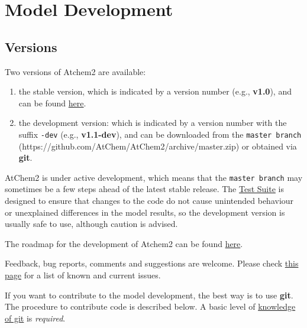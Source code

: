 \chapter{Model Development} \label{ch:development}

\section{Versions} \label{sec:versions}

Two versions of Atchem2 are available:

\begin{enumerate}
\item the stable version, which is indicated by a version number
  (e.g., \textbf{v1.0}), and can be found
  \href{https://github.com/AtChem/AtChem2/releases}{here}.
\item the development version: which is indicated by a version number
  with the suffix \texttt{-dev} (e.g., \textbf{v1.1-dev}), and can be
  downloaded from the \texttt{master\ branch}
  (https://github.com/AtChem/AtChem2/archive/master.zip) or obtained
  via \textbf{git}.
\end{enumerate}

AtChem2 is under active development, which means that the
\texttt{master\ branch} may sometimes be a few steps ahead of the
latest stable release. The \hyperref[sec:testsuite]{Test Suite} is
designed to ensure that changes to the code do not cause unintended
behaviour or unexplained differences in the model results, so the
development version is usually safe to use, although caution is
advised.

The roadmap for the development of Atchem2 can be found
\href{https://github.com/AtChem/AtChem2/projects/1}{here}.

Feedback, bug reports, comments and suggestions are welcome. Please
check \href{https://github.com/AtChem/AtChem2/issues}{this page} for a
list of known and current issues.

If you want to contribute to the model development, the best way is to
use \textbf{git}. The procedure to contribute code is described
below. A basic level of
\href{https://swcarpentry.github.io/git-novice/}{knowledge of git} is
\emph{required}.

